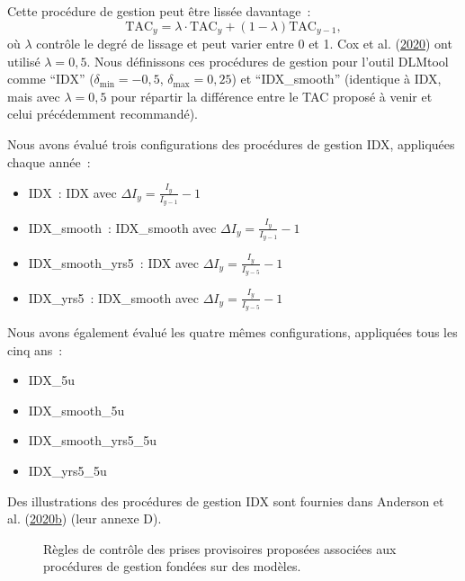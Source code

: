 \documentclass[11pt]{book}
\begin{document}
Cette procédure de gestion peut être lissée davantage~:
\begin{equation}
\textrm{TAC}_y = \lambda \cdot \textrm{TAC}_y + (1-\lambda) \textrm{TAC}_{y-1},
\end{equation}
où \(\lambda\) contrôle le degré de lissage et peut varier entre 0 et 1. Cox et al. (\protect\hyperlink{ref-cox2020}{2020}) ont utilisé \(\lambda=0,5\). Nous définissons ces procédures de gestion pour l'outil DLMtool comme ``IDX'' (\(\delta_{\textrm{min}} = -0,5\), \(\delta_{\textrm{max}} = 0,25\)) et ``IDX\_smooth'' (identique à IDX, mais avec \(\lambda = 0,5\) pour répartir la différence entre le TAC proposé à venir et celui précédemment recommandé).

Nous avons évalué trois configurations des procédures de gestion IDX, appliquées chaque année~:
\begin{itemize}
\item
  IDX~: IDX avec \(\Delta I_y = \frac{I_y}{I_{y-1}} -1\)
\item
  IDX\_smooth~: IDX\_smooth avec \(\Delta I_y = \frac{I_y}{I_{y-1}} -1\)
\item
  IDX\_smooth\_yrs5~: IDX avec \(\Delta I_y = \frac{I_y}{I_{y-5}} -1\)
\item
  IDX\_yrs5~: IDX\_smooth avec \(\Delta I_y = \frac{I_y}{I_{y-5}} -1\)
\end{itemize}
Nous avons également évalué les quatre mêmes configurations, appliquées tous les cinq ans~:
\begin{itemize}
\item
  IDX\_5u
\item
  IDX\_smooth\_5u
\item
  IDX\_smooth\_yrs5\_5u
\item
  IDX\_yrs5\_5u
\end{itemize}
Des illustrations des procédures de gestion IDX sont fournies dans Anderson et al. (\protect\hyperlink{ref-anderson2020gfmp}{2020}\protect\hyperlink{ref-anderson2020gfmp}{b}) (leur annexe D).
\begin{figure}[htb]

{\centering {} 

}

\caption{Règles de contrôle des prises provisoires proposées associées aux procédures de gestion fondées sur des modèles.}\label{fig:mp-hcrs}
\end{figure}

\clearpage
\end{document}
